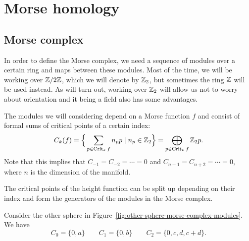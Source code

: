\chapter{Morse homology}
\label{chap:morse-homology}

\section{Morse complex}
In order to define the Morse complex, we need a sequence of modules over a certain ring and maps between these modules.
Most of the time, we will be working over $\mathbb{Z}/2\mathbb{Z}$, which we will denote by $\mathbb{Z}_2$, but sometimes the ring $\mathbb{Z}$ will be used instead. As will turn out, working over $\mathbb{Z}_2$ will allow us not to worry about orientation and it being a field also has some advantages.

The modules we will considering depend on a Morse function $f$ and consist of formal sums of critical points of a certain index:
\[
    C_k(f) = \Big\{ \sum_{p \in \operatorname{Crit}_k f} n_p p  \mid n_p \in \mathbb{Z}_2\Big\}  = \bigoplus_{p \in \operatorname{Crit}_k f} \mathbb{Z}_2 p
.\] 
Note that this implies that $C_{-1} = C_{-2} = \cdots = 0$ and $C_{n+1} = C_{n+2} = \cdots = 0$, where $n$ is the dimension of the manifold.


\begin{marginfigure}
    \centering
    \caption{The critical points of the height function can be split up depending on their index and form the generators of the modules in the Morse complex.}
    \label{fig:other-sphere-morse-complex-modules}
\end{marginfigure}

\begin{eg}
    Consider the other sphere in Figure~\ref{fig:other-sphere-morse-complex-modules}. We have
    \[
    C_0 = \{0, a\}  \qquad C_1 = \{0, b\}  \qquad C_2 = \{0, c, d, c+d\} 
    .\] 
\end{eg}

